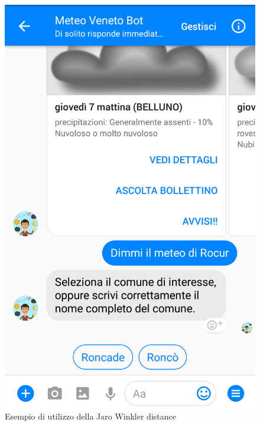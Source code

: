\begin{figure}[!h]
	\centering
	\includegraphics[scale=0.19]{../Immagini/meteo_scelta.png}
	\caption{Esempio di utilizzo della Jaro Winkler distance}
\end{figure}

